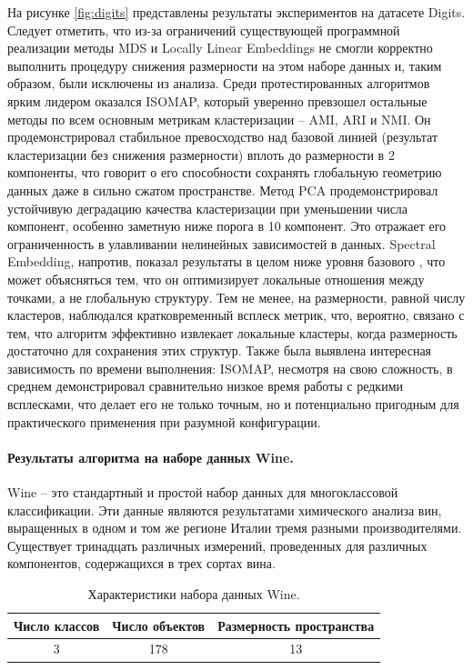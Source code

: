                 На рисунке \ref{fig:digits} представлены результаты экспериментов на датасете Digits. Следует отметить, что из-за ограничений существующей программной реализации методы MDS и Locally Linear Embeddings не смогли корректно выполнить процедуру снижения размерности на этом наборе данных и, таким образом, были исключены из анализа. Среди протестированных алгоритмов ярким лидером оказался ISOMAP, который уверенно превзошел остальные методы по всем основным метрикам кластеризации -- AMI, ARI и NMI. Он продемонстрировал стабильное превосходство над базовой линией (результат кластеризации без снижения размерности) вплоть до размерности в 2 компоненты, что говорит о его способности сохранять глобальную геометрию данных даже в сильно сжатом пространстве. Метод PCA продемонстрировал устойчивую деградацию качества кластеризации при уменьшении числа компонент, особенно заметную ниже порога в 10 компонент. Это отражает его ограниченность в улавливании нелинейных зависимостей в данных. Spectral Embedding, напротив, показал результаты в целом ниже уровня базового \kmeans{}, что может объясняться тем, что он оптимизирует локальные отношения между точками, а не глобальную структуру. Тем не менее, на размерности, равной числу кластеров, наблюдался кратковременный всплеск метрик, что, вероятно, связано с тем, что алгоритм эффективно извлекает локальные кластеры, когда размерность достаточно для сохранения этих структур. Также была выявлена интересная зависимость по времени выполнения: ISOMAP, несмотря на свою сложность, в среднем демонстрировал сравнительно низкое время работы с редкими всплесками, что делает его не только точным, но и потенциально пригодным для практического применения при разумной конфигурации.

            \paragraph{Результаты алгоритма на наборе данных Wine.}
                Wine -- это стандартный и простой набор данных для многоклассовой классификации. Эти данные являются результатами химического анализа вин, выращенных в одном и том же регионе Италии тремя разными производителями. Существует тринадцать различных измерений, проведенных для различных компонентов, содержащихся в трех сортах вина.

                \begin{table}[H]
                    \centering
                    \caption{Характеристики набора данных Wine.}
                    \begin{tabular}{ccc}
                        \toprule
                        Число классов &   Число объектов &   Размерность пространства \\
                        \midrule
                        3    &  178 &  13 \\
                        \bottomrule
                    \end{tabular}
                \end{table}

